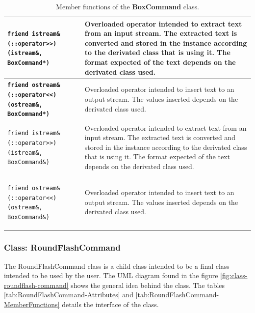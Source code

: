 \documentclass[11pt,twoside,openany,x11names,svgnames]{memoir}
\begin{document}
\begin{table}[h]
\begin{tabular}{| >{\bfseries}p{9cm} | p{6.5cm} |}
	\hline	
		
	\texttt{friend istream\& (::operator>>) (istream\&, BoxCommand*)} & Overloaded operator intended to extract text from an input stream. The extracted text is converted and stored in the instance according to the derivated class that is using it. The format expected of the text depends on the derivated class used. \\
	
	\hline
	
	\texttt{friend ostream\& (::operator<<) (ostream\&, BoxCommand*)} & Overloaded operator intended to insert text to an output stream. The values inserted depends on the derivated class used. \\
	
	\hline
	
	\texttt{friend istream\& (::operator>>) (istream\&, BoxCommand\&)} & Overloaded operator intended to extract text from an input stream. The extracted text is converted and stored in the instance according to the derivated class that is using it. The format expected of the text depends on the derivated class used. \\
	
	\hline
	
	\texttt{friend ostream\& (::operator<<) (ostream\&, BoxCommand\&)} & Overloaded operator intended to insert text to an output stream. The values inserted depends on the derivated class used. \\
	
	\hline
\end{tabular}
\caption{Member functions of the \textbf{BoxCommand} class.}
\label{tab:BoxCommand-MemberFunctions}
\end{table}

\clearpage

\subsubsection{Class: RoundFlashCommand}\label{Class-RoundFlashCommand}

The RoundFlashCommand class is a child class intended to be a final class intended to be used by the user. The UML diagram found in the figure \ref{fig:class-roundflash-command} shows the general idea behind the class. The tables \ref{tab:RoundFlashCommand-Attributes} and \ref{tab:RoundFlashCommand-MemberFunctions} details the interface of the class.
\end{document}
